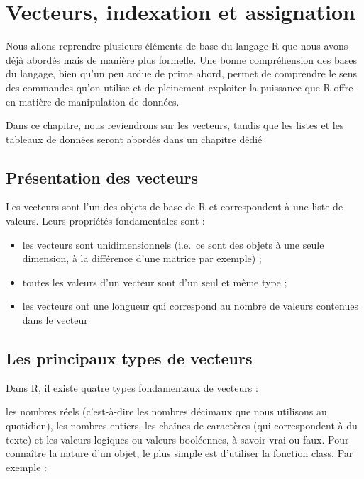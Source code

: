 \documentclass[
]{book}
\providecommand{\tightlist}{%
  \setlength{\itemsep}{0pt}\setlength{\parskip}{0pt}}
\begin{document}
\hypertarget{vecteurs-indexation-et-assignation}{%
\chapter{Vecteurs, indexation et assignation}\label{vecteurs-indexation-et-assignation}}

Nous allons reprendre plusieurs éléments de base du langage R que nous avons déjà abordés mais de manière plus formelle. Une bonne compréhension des bases du langage, bien qu'un peu ardue de prime abord, permet de comprendre le sens des commandes qu'on utilise et de pleinement exploiter la puissance que R offre en matière de manipulation de données.

Dans ce chapitre, nous reviendrons sur les vecteurs, tandis que les listes et les tableaux de données seront abordés dans un chapitre dédié

\hypertarget{pruxe9sentation-des-vecteurs}{%
\section{Présentation des vecteurs}\label{pruxe9sentation-des-vecteurs}}

Les vecteurs sont l'un des objets de base de R et correspondent à une liste de valeurs. Leurs propriétés fondamentales sont :

\begin{itemize}
\tightlist
\item
  les vecteurs sont unidimensionnels (i.e.~ce sont des objets à une seule dimension, à la différence d'une matrice par exemple) ;
\item
  toutes les valeurs d'un vecteur sont d'un seul et même type ;
\item
  les vecteurs ont une longueur qui correspond au nombre de valeurs contenues dans le vecteur
\end{itemize}

\hypertarget{les-principaux-types-de-vecteurs}{%
\section{Les principaux types de vecteurs}\label{les-principaux-types-de-vecteurs}}

Dans R, il existe quatre types fondamentaux de vecteurs :

les nombres réels (c'est-à-dire les nombres décimaux que nous utilisons au quotidien),
les nombres entiers,
les chaînes de caractères (qui correspondent à du texte) et
les valeurs logiques ou valeurs booléennes, à savoir vrai ou faux.
Pour connaître la nature d'un objet, le plus simple est d'utiliser la fonction \href{http://rdrr.io/pkg/base/sym/class}{class}. Par exemple :
\end{document}

